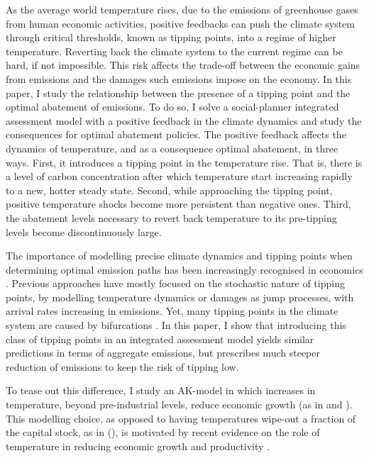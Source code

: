 \documentclass[../../main.tex]{subfiles}
\begin{document}
As the average world temperature rises, due to the emissions of greenhouse gases from human economic activities, positive feedbacks can push the climate system through critical thresholds, known as tipping points, into a regime of higher temperature. Reverting back the climate system to the current regime can be hard, if not impossible. This risk affects the trade-off between the economic gains from emissions and the damages such emissions impose on the economy. In this paper, I study the relationship between the presence of a tipping point and the optimal abatement of emissions. To do so, I solve a social-planner integrated assessment model with a positive feedback in the climate dynamics \citep[pp. 81-116]{mcguffie_climate_2005} and study the consequences for optimal abatement policies. The positive feedback affects the dynamics of temperature, and as a consequence optimal abatement, in three ways. First, it introduces a tipping point in the temperature rise. That is, there is a level of carbon concentration after which temperature start increasing rapidly to a new, hotter steady state. Second, while approaching the tipping point, positive temperature shocks become more persistent than negative ones. Third, the abatement levels necessary to revert back temperature to its pre-tipping levels become discontinuously large. 

The importance of modelling precise climate dynamics and tipping points when determining optimal emission paths has been increasingly recognised in economics \citep{van_den_bremer_risk-adjusted_2021,dietz_economic_2021,dietz_are_2020,taconet_social_2021,lontzek_stochastic_2015}. Previous approaches have mostly focused on the stochastic nature of tipping points, by modelling temperature dynamics \citep{dietz_economic_2021} or damages \citep{lontzek_stochastic_2015} as jump processes, with arrival rates increasing in emissions. Yet, many tipping points in the climate system are caused by bifurcations \citep{ashwin_extreme_2020,ashwin_tipping_2012}. In this paper, I show that introducing this class of tipping points in an integrated assessment model yields similar predictions in terms of aggregate emissions, but prescribes much steeper reduction of emissions to keep the risk of tipping low.

To tease out this difference, I study an AK-model in which increases in temperature, beyond pre-industrial levels, reduce economic growth (as in \cite{pindyck_economic_2013} and \cite{hambel_optimal_2021}). This modelling choice, as opposed to having temperatures wipe-out a fraction of the capital stock, as in \citeauthor{nordhaus_estimates_2014} (\citeyear{nordhaus_estimates_2014,nordhaus_revisiting_2017}), is motivated by recent evidence on the role of temperature in reducing economic growth and productivity \citep{burke_global_2015, dietz_growth_2019}.
\end{document}

